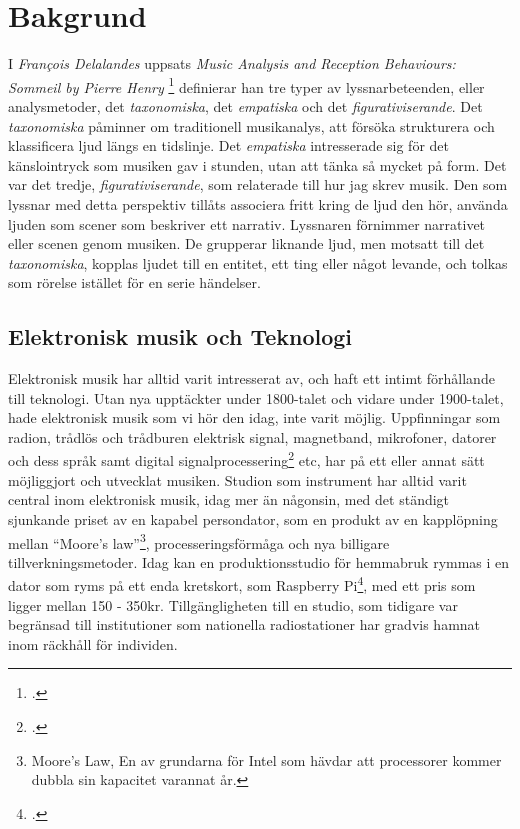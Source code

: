 \documentclass{article}
\begin{document}
\section{Bakgrund}
I \emph{François Delalandes} uppsats \emph{Music Analysis and Reception Behaviours: Sommeil by Pierre Henry}
\footcite[26, 38, 52]{Delalande1998} definierar han tre typer av lyssnarbeteenden, eller analysmetoder, det
\emph{taxonomiska}, det \emph{empatiska} och det \emph{figurativiserande}. Det \emph{taxonomiska} påminner om
traditionell musikanalys, att försöka strukturera och klassificera ljud längs en tidslinje. Det
\emph{empatiska} intresserade sig för det känslointryck som musiken gav i stunden, utan att tänka så mycket på
form. Det var det tredje, \emph{figurativiserande}, som relaterade till hur jag skrev musik. Den som lyssnar
med detta perspektiv tillåts associera fritt kring de ljud den hör, använda ljuden som scener som beskriver
ett narrativ. Lyssnaren förnimmer narrativet eller scenen genom musiken. De grupperar liknande ljud,
men motsatt till det \emph{taxonomiska}, kopplas ljudet till en entitet, ett ting eller något levande, och
tolkas som rörelse istället för en serie händelser.

\subsection{Elektronisk musik och Teknologi}
Elektronisk musik har alltid varit intresserat av, och haft ett intimt förhållande till teknologi. Utan nya
upptäckter under 1800-talet och vidare under 1900-talet, hade elektronisk musik som vi hör den idag, inte
varit möjlig. Uppfinningar som radion, trådlös och trådburen elektrisk signal, magnetband, mikrofoner, datorer
och dess språk samt digital
signalprocessering\footcite{dsp} etc, har på
ett eller annat sätt möjliggjort och utvecklat musiken. Studion som instrument %
har alltid varit central inom elektronisk musik, idag mer än någonsin, med det ständigt sjunkande
priset av en kapabel persondator, som en produkt av en kapplöpning mellan ``Moore's law''\footnote{Moore's
Law, En av grundarna för Intel som hävdar att processorer kommer dubbla sin kapacitet varannat år.},
processeringsförmåga och nya billigare tillverkningsmetoder. Idag kan en produktionsstudio för hemmabruk
rymmas i en dator som ryms på ett enda kretskort, som Raspberry Pi\footcite{rpi}, med ett pris som ligger mellan 150 - 350kr. Tillgängligheten till en studio, som tidigare var begränsad till institutioner som nationella radiostationer har gradvis hamnat inom
räckhåll för individen.
\end{document}
